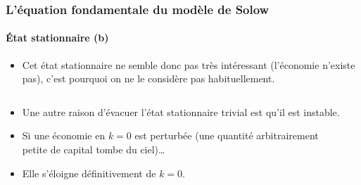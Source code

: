\documentclass[10pt,notheorems]{beamer}
\theoremstyle{plain}
\theoremstyle{definition} %
\begin{document}
\begin{frame}
  \frametitle{L'équation fondamentale du modèle de Solow}
  \framesubtitle{État stationnaire (b)}

  \bigskip

  \begin{itemize}

  \item Cet état stationnaire ne semble donc pas très intéressant
    (l'économie n'existe pas), c'est pourquoi on ne le considère pas habituellement.\newline

  \end{itemize}

  \begin{columns}
    \begin{column}{0.5\textwidth}
      \begin{itemize}
      \item Une autre raison d'évacuer l'état stationnaire trivial
        est qu'il est instable.
      \item Si une économie en $k=0$ est perturbée (une quantité
        arbitrairement petite de capital tombe du ciel)\ldots
      \item Elle s'éloigne définitivement de $k=0$.
      \end{itemize}
    \end{column}
    \begin{column}{0.5\textwidth}
\end{column}
\end{columns}
\end{frame}
\end{document}
